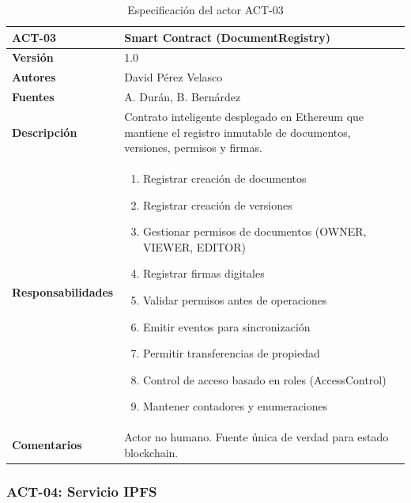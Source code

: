 \documentclass[11pt, a4paper]{article}
\begin{document}
\begin{table}[H]
    \centering
    \small
    \begin{tabular}{|p{4cm}|p{10cm}|}
    \hline
    \textbf{ACT-03} & Smart Contract (DocumentRegistry) \\
    \hline
    \textbf{Versión} & 1.0 \\
    \hline
    \textbf{Autores} & David Pérez Velasco \\
    \hline
    \textbf{Fuentes} & A. Durán, B. Bernárdez \\
    \hline
    \textbf{Descripción} & Contrato inteligente desplegado en Ethereum que mantiene el registro inmutable de documentos, versiones, permisos y firmas. \\
    \hline
    \textbf{Responsabilidades} & 
    \begin{enumerate}
        \item Registrar creación de documentos
        \item Registrar creación de versiones
        \item Gestionar permisos de documentos (OWNER, VIEWER, EDITOR)
        \item Registrar firmas digitales
        \item Validar permisos antes de operaciones
        \item Emitir eventos para sincronización
        \item Permitir transferencias de propiedad
        \item Control de acceso basado en roles (AccessControl)
        \item Mantener contadores y enumeraciones
    \end{enumerate} \\
    \hline
    \textbf{Comentarios} & Actor no humano. Fuente única de verdad para estado blockchain. \\
    \hline
    \end{tabular}
    \caption{Especificación del actor ACT-03}
\end{table}

\subsubsection{ACT-04: Servicio IPFS}
\end{document}
